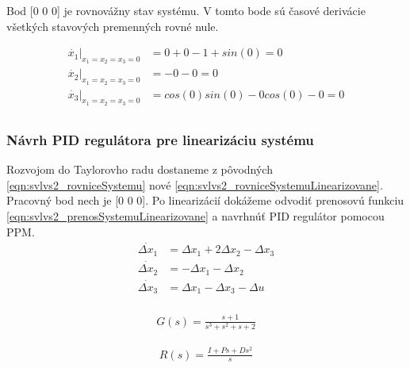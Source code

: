 \documentclass[../main.tex]{subfiles}
\begin{document}
Bod [0 0 0] je rovnovážny stav systému. V tomto bode sú časové derivácie všetkých stavových premenných rovné nule.

	\begin{equation}
		\begin{aligned}
		\dot{x_1}|_{x_1 = x_2 = x_3 = 0} &= 0 + 0 - 1 + sin(0) = 0 					\\
		\dot{x_2}|_{x_1 = x_2 = x_3 = 0} &= -0 - 0 = 0 							\\
		\dot{x_3}|_{x_1 = x_2 = x_3 = 0} &= cos(0)sin(0) - 0cos(0) - 0 = 0 			\\
		\end{aligned}
		\label{eqn:svlvs2_rovniceRovnovaznyStav}
	\end{equation}
\subsubsection{Návrh PID regulátora pre linearizáciu systému}

Rozvojom do Taylorovho radu dostaneme z pôvodných \cref{eqn:svlvs2_rovniceSystemu} nové \cref{eqn:svlvs2_rovniceSystemuLinearizovane}. Pracovný bod nech je [0 0 0]. Po linearizácií dokážeme odvodiť prenosovú funkciu \cref{eqn:svlvs2_prenosSystemuLinearizovane} a navrhnúť PID regulátor pomocou PPM.
\begin{equation}
		\begin{aligned}
		\dot{\Delta x_1} &= \Delta x_1 + 2\Delta x_2 - \Delta x_3 			\\	
		\dot{\Delta x_2} &= - \Delta x_1 - \Delta x_2 					\\
		\dot{\Delta x_3} &=  \Delta x_1 - \Delta x_3 - \Delta u 				\\
		\end{aligned}
		\label{eqn:svlvs2_rovniceSystemuLinearizovane}
\end{equation}

\begin{equation}
		\begin{aligned}
		G(s) = \frac{s+1}{s^3+s^2+s+2}
		\end{aligned}
		\label{eqn:svlvs2_prenosSystemuLinearizovane}
\end{equation}

\begin{equation}
		\begin{aligned}
		R(s) = \frac{I + Ps + Ds^2}{s}
		\end{aligned}
		\label{eqn:svlvs2_prenosRegulatoraPID}
\end{equation}
\end{document}
